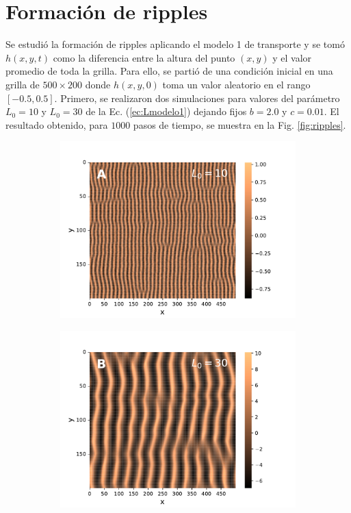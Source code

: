 \documentclass[11pt,twocolumn,twoside]{opticajnl}
\begin{document}
\section{Formación de ripples}

Se estudió la formación de ripples aplicando el modelo 1 de transporte y se tomó $h(x,y,t)$ como la diferencia entre la altura del punto $(x,y)$ y el valor promedio de toda la grilla. Para ello, se partió de una condición inicial en una grilla de $500 \times 200$ donde $h(x,y,0)$ toma un valor aleatorio en el rango $[-0.5,0.5]$. Primero, se realizaron dos simulaciones para valores del parámetro $L_0=10$ y $L_0=30$ de la Ec. (\ref{ec:Lmodelo1}) dejando fijos $b=2.0$ y $c=0.01$. El resultado obtenido, para $1000$ pasos de tiempo, se muestra en la Fig. \ref{fig:ripples}.

\begin{figure}[H]
\centering
     \begin{subfigure}[b]{\linewidth}
        \includegraphics[width=\textwidth]{Figuras/ripple_L0=10.pdf}
         \label{fig:ripple_L0=10}
         \vspace{-1.5cm}
     \end{subfigure}
     \begin{subfigure}[b]{\linewidth}
         \includegraphics[width=\textwidth]{Figuras/ripple_L0=30.pdf}

\end{subfigure}
\end{figure}
\end{document}
